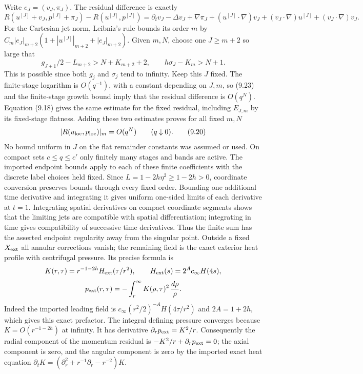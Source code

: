 \documentclass[10pt,a4paper]{article}
\begin{document}
Write $e_J=(v_J,\pi_J)$. The residual difference is exactly
\[
R(u^{[J]}+v_J,p^{[J]}+\pi_J)-R(u^{[J]},p^{[J]})
=\partial_tv_J-\Delta v_J+\nabla\pi_J
+(u^{[J]}\cdot\nabla)v_J+(v_J\cdot\nabla)u^{[J]}
+(v_J\cdot\nabla)v_J .
\]
For the Cartesian jet norm, Leibniz's rule bounds its order $m$ by
$C_m|e_J|_{m+2}(1+|u^{[J]}|_{m+2}+|e_J|_{m+2})$.
Given $m,N$, choose one $J\ge m+2$ so large that
\[
g_{J+1}/2-L_{m+2}>N+K_{m+2}+2,\qquad
h\sigma_J-K_m>N+1 .
\]
This is possible since both $g_j$ and $\sigma_j$ tend to infinity.
Keep this $J$ fixed. The finite-stage logarithm is
$O(q^{-1})$, with a constant depending on $J,m$, so (9.23) and the
finite-stage growth bound imply that the residual difference is
$O(q^N)$. Equation (9.18) gives the same estimate for the fixed
residual, including $E_{J,m}$ by its fixed-stage flatness. Adding
these two estimates proves for all fixed $m,N$
\[
 |R(u_{\rm loc},p_{\rm loc})|_m=O(q^N)\qquad(q\downarrow0).          \tag{9.20}
\]
No bound uniform in $J$ on the flat remainder constants was assumed or
used. On compact sets $c\le q\le c'$ only finitely many stages and bands are
active. The imported endpoint bounds apply to each of these finite
coefficients with the discrete label choices held fixed. Since
$L=1-2h\eta^2\ge1-2h>0$, coordinate conversion preserves bounds through
every fixed order. Bounding one additional time derivative and
integrating it gives uniform one-sided limits of each derivative at
$t=1$. Integrating spatial derivatives on compact coordinate segments
shows that the limiting jets are compatible with spatial
differentiation; integrating in time gives compatibility of successive
time derivatives. Thus the finite sum has the asserted endpoint
regularity away from the singular point.
Outside a fixed $X_{\rm ext}$ all annular corrections vanish; the remaining field
is the exact exterior heat profile with centrifugal pressure. Its precise
formula is
\[
K(r,\tau)=r^{-1-2h}H_{\rm ext}(\tau/r^2),\qquad
H_{\rm ext}(s)=2^A c_\infty H(4s),
\]
\[
p_{\rm ext}(r,\tau)=-\int_r^\infty K(\rho,\tau)^2\,\frac{d\rho}{\rho}.
\]
Indeed the imported leading field is
$c_\infty(r^2/2)^{-A}H(4\tau/r^2)$ and $2A=1+2h$, which gives
this exact prefactor. The integral defining pressure converges because
$K=O(r^{-1-2h})$ at infinity. It has derivative
$\partial_rp_{\rm ext}=K^2/r$. Consequently the radial component of
the momentum residual is $-K^2/r+\partial_rp_{\rm ext}=0$; the
axial component is zero, and the angular component is zero by the
imported exact heat equation
$\partial_tK=(\partial_r^2+r^{-1}\partial_r-r^{-2})K$.
\end{document}
